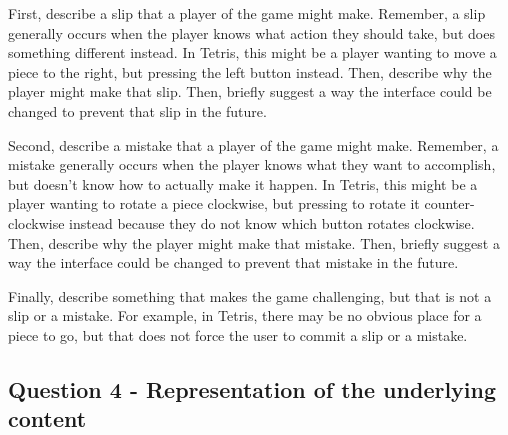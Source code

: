 \documentclass[12pt,letterpaper]{article}
\begin{document}
First, describe a slip that a player of the game might make. Remember, a slip generally occurs when the player knows what action they should take, but does something different instead. In Tetris, this might be a player wanting to move a piece to the right, but pressing the left button instead. Then, describe why the player might make that slip. Then, briefly suggest a way the interface could be changed to prevent that slip in the future.

Second, describe a mistake that a player of the game might make. Remember, a mistake generally occurs when the player knows what they want to accomplish, but doesn’t know how to actually make it happen. In Tetris, this might be a player wanting to rotate a piece clockwise, but pressing to rotate it counter-clockwise instead because they do not know which button rotates clockwise. Then, describe why the player might make that mistake. Then, briefly suggest a way the interface could be changed to prevent that mistake in the future.

Finally, describe something that makes the game challenging, but that is not a slip or a mistake. For example, in Tetris, there may be no obvious place for a piece to go, but that does not force the user to commit a slip or a mistake.

\subsection*{Question 4 - Representation of the underlying content}

 

\end{document}
